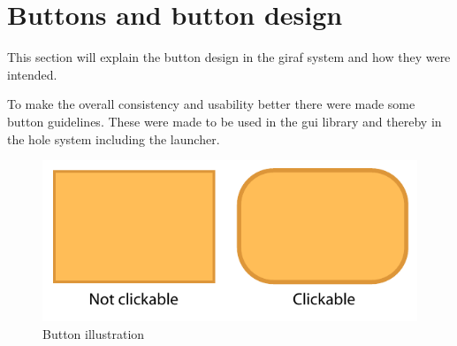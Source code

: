 \section{Buttons and button design}
This section will explain the button design in the giraf system and how they were intended.

To make the overall consistency and usability better there were made some button guidelines. These were made to be used in the \giraf[] gui library and thereby in the hole \giraf[] system including the launcher.


\begin{figure}[h!]
	\centering
	\includegraphics[scale=0.6]{gfx/buttons.pdf}
	\caption{Button illustration}
	\label{fig:buttons}
\end{figure}




